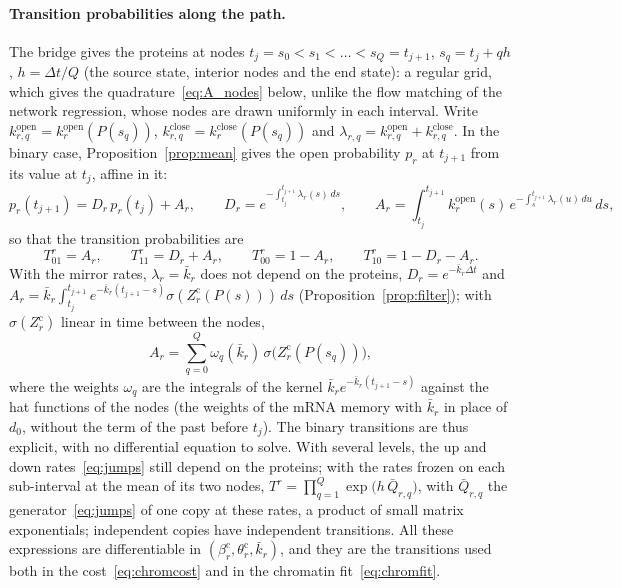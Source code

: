 \documentclass[a4paper, 11pt]{article}
\newcommand{\kop}{k^{\mathrm{open}}}
\newcommand{\kcl}{k^{\mathrm{close}}}
\newcommand{\thc}{\theta^{\mathrm{c}}}
\newcommand{\bc}{\beta^{\mathrm{c}}}
\theoremstyle{plain}
\theoremstyle{remark}
\begin{document}
\paragraph{Transition probabilities along the path.} The bridge gives the proteins at nodes $t_j = s_0 < s_1 < \dots < s_Q = t_{j+1}$, $s_q = t_j + qh$, $h = \Delta t/Q$ (the source state, interior nodes and the end state): a regular grid, which gives the quadrature~\eqref{eq:A_nodes} below, unlike the flow matching of the network regression, whose nodes are drawn uniformly in each interval. Write $\kop_{r,q} = \kop_r(P(s_q))$, $\kcl_{r,q} = \kcl_r(P(s_q))$ and $\lambda_{r,q} = \kop_{r,q} + \kcl_{r,q}$. In the binary case, Proposition~\ref{prop:mean} gives the open probability $p_r$ at $t_{j+1}$ from its value at $t_j$, affine in it:
\begin{equation}\label{eq:affine}
p_r(t_{j+1}) = D_r\,p_r(t_j) + A_r, \qquad
D_r = e^{-\int_{t_j}^{t_{j+1}} \lambda_r(s)\,ds}, \qquad
A_r = \int_{t_j}^{t_{j+1}} \kop_r(s)\,e^{-\int_s^{t_{j+1}} \lambda_r(u)\,du}\,ds ,
\end{equation}
so that the transition probabilities are
\begin{equation}\label{eq:T_binary}
T^r_{01} = A_r, \qquad T^r_{11} = D_r + A_r, \qquad T^r_{00} = 1 - A_r, \qquad T^r_{10} = 1 - D_r - A_r .
\end{equation}
With the mirror rates, $\lambda_r = \bar k_r$ does not depend on the proteins, $D_r = e^{-\bar k_r\Delta t}$ and $A_r = \bar k_r\int_{t_j}^{t_{j+1}} e^{-\bar k_r(t_{j+1}-s)}\sigma(Z^{\mathrm{c}}_r(P(s)))\,ds$ (Proposition~\ref{prop:filter}); with $\sigma(Z^{\mathrm{c}}_r)$ linear in time between the nodes,
\begin{equation}\label{eq:A_nodes}
A_r = \sum_{q=0}^{Q}\omega_q(\bar k_r)\,\sigma\bigl(Z^{\mathrm{c}}_r(P(s_q))\bigr),
\end{equation}
where the weights $\omega_q$ are the integrals of the kernel $\bar k_r e^{-\bar k_r(t_{j+1}-s)}$ against the hat functions of the nodes (the weights of the mRNA memory with $\bar k_r$ in place of $d_0$, without the term of the past before $t_j$). The binary transitions are thus explicit, with no differential equation to solve. With several levels, the up and down rates~\eqref{eq:jumps} still depend on the proteins; with the rates frozen on each sub-interval at the mean of its two nodes, $T^r = \prod_{q=1}^{Q}\exp\bigl(h\,\bar Q_{r,q}\bigr)$, with $\bar Q_{r,q}$ the generator~\eqref{eq:jumps} of one copy at these rates, a product of small matrix exponentials; independent copies have independent transitions. All these expressions are differentiable in $(\bc_r, \thc_r, \bar k_r)$, and they are the transitions used both in the cost~\eqref{eq:chromcost} and in the chromatin fit~\eqref{eq:chromfit}.
\end{document}
